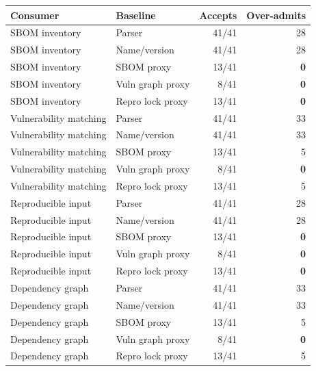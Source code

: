 \begin{tabular}{llrr}
\toprule
Consumer & Baseline & Accepts & Over-admits \\
\midrule
SBOM inventory & Parser & 41/41 & 28 \\
SBOM inventory & Name/version & 41/41 & 28 \\
SBOM inventory & SBOM proxy & 13/41 & \textbf{0} \\
SBOM inventory & Vuln graph proxy & 8/41 & \textbf{0} \\
SBOM inventory & Repro lock proxy & 13/41 & \textbf{0} \\
Vulnerability matching & Parser & 41/41 & 33 \\
Vulnerability matching & Name/version & 41/41 & 33 \\
Vulnerability matching & SBOM proxy & 13/41 & 5 \\
Vulnerability matching & Vuln graph proxy & 8/41 & \textbf{0} \\
Vulnerability matching & Repro lock proxy & 13/41 & 5 \\
Reproducible input & Parser & 41/41 & 28 \\
Reproducible input & Name/version & 41/41 & 28 \\
Reproducible input & SBOM proxy & 13/41 & \textbf{0} \\
Reproducible input & Vuln graph proxy & 8/41 & \textbf{0} \\
Reproducible input & Repro lock proxy & 13/41 & \textbf{0} \\
Dependency graph & Parser & 41/41 & 33 \\
Dependency graph & Name/version & 41/41 & 33 \\
Dependency graph & SBOM proxy & 13/41 & 5 \\
Dependency graph & Vuln graph proxy & 8/41 & \textbf{0} \\
Dependency graph & Repro lock proxy & 13/41 & 5 \\
\bottomrule
\end{tabular}

